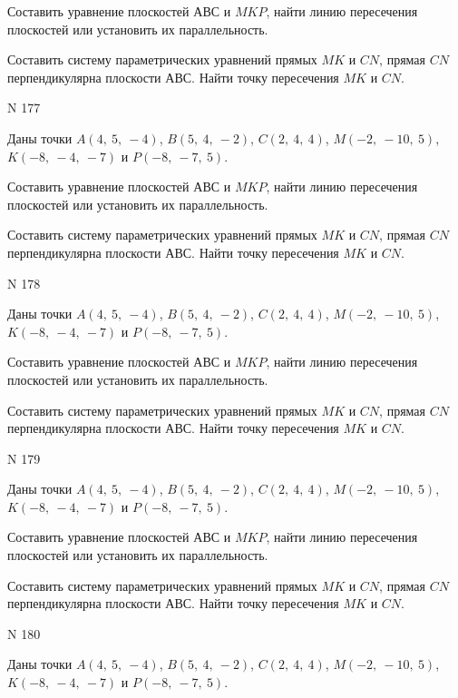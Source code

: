 \documentclass[11pt]{report}
\begin{document}
Составить уравнение плоскостей $АВС$ и $MKP$,
найти линию пересечения плоскостей или установить их параллельность.

Составить систему параметрических уравнений прямых $MK$ и $CN$,
прямая $CN$ перпендикулярна плоскости $АВС$. 
Найти точку пересечения $MK$ и $CN$.



 N 177

Даны точки $A\left( 4, \  5, \  -4\right)$, $B\left( 5, \  4, \  -2\right)$, $C\left( 2, \  4, \  4\right)$, $M\left( -2, \  -10, \  5\right)$, $K\left( -8, \  -4, \  -7\right)$ и $P\left( -8, \  -7, \  5\right)$.


Составить уравнение плоскостей $АВС$ и $MKP$,
найти линию пересечения плоскостей или установить их параллельность.

Составить систему параметрических уравнений прямых $MK$ и $CN$,
прямая $CN$ перпендикулярна плоскости $АВС$. 
Найти точку пересечения $MK$ и $CN$.



 N 178

Даны точки $A\left( 4, \  5, \  -4\right)$, $B\left( 5, \  4, \  -2\right)$, $C\left( 2, \  4, \  4\right)$, $M\left( -2, \  -10, \  5\right)$, $K\left( -8, \  -4, \  -7\right)$ и $P\left( -8, \  -7, \  5\right)$.


Составить уравнение плоскостей $АВС$ и $MKP$,
найти линию пересечения плоскостей или установить их параллельность.

Составить систему параметрических уравнений прямых $MK$ и $CN$,
прямая $CN$ перпендикулярна плоскости $АВС$. 
Найти точку пересечения $MK$ и $CN$.



 N 179

Даны точки $A\left( 4, \  5, \  -4\right)$, $B\left( 5, \  4, \  -2\right)$, $C\left( 2, \  4, \  4\right)$, $M\left( -2, \  -10, \  5\right)$, $K\left( -8, \  -4, \  -7\right)$ и $P\left( -8, \  -7, \  5\right)$.


Составить уравнение плоскостей $АВС$ и $MKP$,
найти линию пересечения плоскостей или установить их параллельность.

Составить систему параметрических уравнений прямых $MK$ и $CN$,
прямая $CN$ перпендикулярна плоскости $АВС$. 
Найти точку пересечения $MK$ и $CN$.



 N 180

Даны точки $A\left( 4, \  5, \  -4\right)$, $B\left( 5, \  4, \  -2\right)$, $C\left( 2, \  4, \  4\right)$, $M\left( -2, \  -10, \  5\right)$, $K\left( -8, \  -4, \  -7\right)$ и $P\left( -8, \  -7, \  5\right)$.
\end{document}
